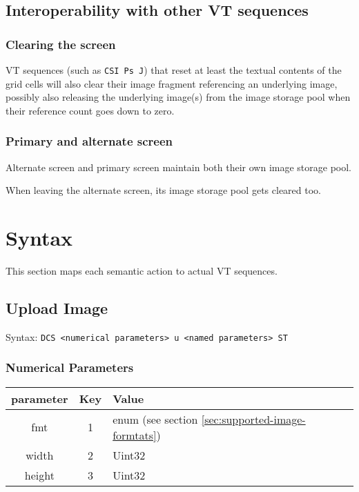 \documentclass{article}
\newcommand{\code}[1]{\colorbox{light-gray}{\texttt{#1}}}
\begin{document}
\subsection{Interoperability with other VT sequences}

\subsubsection*{Clearing the screen}

VT sequences (such as \code{CSI Ps J}) that reset at least the textual contents of the grid cells will also
clear their image fragment referencing an underlying image, possibly also releasing the
underlying image(s) from the image storage pool when their reference count goes down to zero.

\subsubsection*{Primary and alternate screen}

Alternate screen and primary screen maintain both their own image storage pool.

When leaving the alternate screen, its image storage pool gets cleared too.
\section{Syntax} %

This section maps each semantic action to actual VT sequences.

\subsection{Upload Image}

Syntax: \code{DCS <numerical parameters> u <named parameters> ST}

\subsubsection*{Numerical Parameters}

\begin{tabular}{ |c|c|l| }
    \hline
    \textbf{parameter}   & \textbf{Key} & \textbf{Value} \\
    \hline
    fmt         & 1   & enum (see section \ref{sec:supported-image-formtats}) \\
    width       & 2   & Uint32 \\
    height      & 3   & Uint32 \\
    \hline
\end{tabular}
\end{document}
